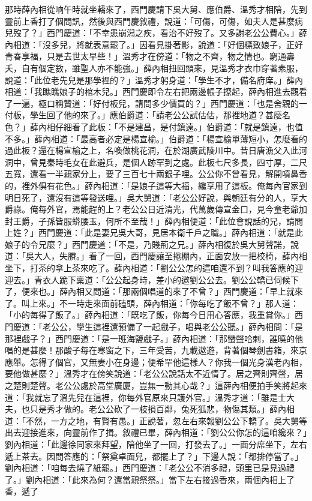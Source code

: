 \begin{showcontents}{}
那時薛內相從响午時就坐轎來了，西門慶請下吳大舅、應伯爵、溫秀才相陪，先到靈前上香打了個問訊，然後與西門慶敘禮，說道：「可傷，可傷，如夫人是甚麼病兒歿了？」西門慶道：「不幸患崩潟之疾，看治不好歿了。又多謝老公公費心。」薛內相道：「沒多兒，將就表意罷了。」因看見掛著影，說道：「好個標致娘子，正好青春享福，只是去世太早些！」溫秀才在傍道：「物之不齊，物之情也。窮通壽夭，自有個定數，雖聖人亦不能強。」薛內相扭回頭來，見溫秀才衣巾穿著素服，說道：「此位老先兒是那學裡的？」溫秀才躬身道：「學生不才，備名府庠。」薛內相道：「我瞧瞧娘子的棺木兒。」西門慶即令左右把兩邊帳子撩起，薛內相進去觀看了一遍，極口稱贊道：「好付板兒，請問多少價買的？」西門慶道：「也是舍親的一付板，學生回了他的來了。」應伯爵道：「請老公公試估估，那裡地道？甚麼名色？」薛內相仔細看了此板：「不是建昌，是付鎮遠。」伯爵道：「就是鎮遠，也值不多。」薛內相道：「最高者必定是楊宣榆。」伯爵道：「楊宣榆單薄短小，怎麼看的過此板？還在楊宣榆之上，名喚做桃花洞，在於湖廣武陵川中。昔日唐漁父入此河洞中，曾見秦時毛女在此避兵，是個人跡罕到之處。此板七尺多長，四寸厚，二尺五寬，還看一半親家分上，要了三百七十兩銀子哩。公公你不曾看見，解開噴鼻香的，裡外俱有花色。」薛內相道：「是娘子這等大福，纔享用了這板。俺每內官家到明日死了，還沒有這等發送哩。」吳大舅道：「老公公好說，與朝廷有分的人，享大爵祿。俺每外官，焉能趕的上？老公公日近清光，代萬歲傳宣金口，見今童老爺加封王爵，子孫皆服蟒腰玉，何所不至哉！」薛內相便道：「此位會說話的兄，請問上姓？」西門慶道：「此是妻兄吳大哥，見居本衛千戶之職。」薛內相道：「就是此娘子的令兄麼？」西門慶道：「不是，乃賤荊之兄。」薛內相復於吳大舅聲諾，說道：「吳大人，失賸。」看了一回，西門慶讓至捲棚內，正面安放一把校椅，薛內相坐下，打茶的拿上茶來吃了。薛內相道：「劉公公怎的這咱還不到？叫我答應的迎迎去。」青衣人跪下稟道：「公公起身時，差小的邀劉公公去。劉公公轎已伺候下了，便來也。」薛內相又問道：「那兩個唱道的來了不曾？」西門慶道：「早上就來了。叫上來。」不一時走來面前磕頭，薛內相道：「你每吃了飯不曾？」那人道：「小的每得了飯了。」薛內相道：「既吃了飯，你每今日用心答應，我重賞你。」西門慶道：「老公公，學生這裡還預備了一起戲子，唱與老公公聽。」薛內相問：「是那裡戲子？」西門慶道：「是一班海鹽戲子。」薛內相道：「那蠻聲哈刺，誰曉的他唱的是甚麼！那酸子每在寒窗之下，三年受苦，九載遨遊，背著個琴劍書箱，來京應舉。怎得了個官，又無妻小在身邊；便希罕他這樣人？你我一個光身漢老內相，要他做甚麼？」溫秀才在傍笑說道：「老公公說話太不近情了。居之齊則齊聲，居之楚則楚聲。老公公處於高堂廣廈，豈無一動其心哉？」這薛內相便拍手笑將起來道：「我就忘了溫先兒在這裡，你每外官原來只護外官。」溫秀才道：「雖是士大夫，也只是秀才做的。老公公砍了一枝損百鄰，兔死狐悲，物傷其類。」薛內相道：「不然，一方之地，有賢有愚。」正說著，忽左右來報劉公公下轎了。吳大舅等出去迎接進來，向靈前作了揖。敘禮已畢，薛內相道：「劉公公你怎的這咱纔來？」劉內相道：「此邊徐同家來拜望，陪他坐了一回，打發去了。」一面分席坐下，左右遞上茶去。因問答應的：「祭奠卓面兒，都擺上了？」下邊人說：「都排停當了。」劉內相道：「咱每去燒了紙罷。」西門慶道：「老公公不消多禮，頭里已是見過禮了。」劉內相道：「此來為何？還當親祭祭。」當下左右接過香來，兩個內相上了香，遞了
\end{showcontents}
